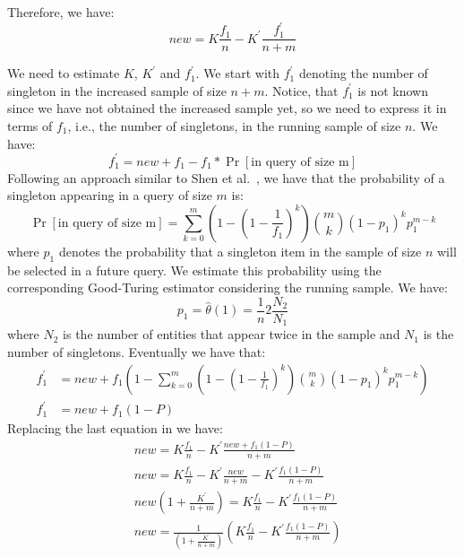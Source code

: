 \documentclass{vldb}
\begin{document}
\begin{appendix}
Therefore, we have:
\begin{equation}
\label{eq:new}
new = K\frac{f_1}{n} - K^{\prime}\frac{f^{\prime}_1}{n+m}
\end{equation}

We need to estimate $K$, $K^{\prime}$ and $f^{\prime}_1$. We start with $f^{\prime}_1$ denoting the number of singleton in the increased sample of size $n+m$. Notice, that $f^{\prime}_1$ is not known since we have not obtained the increased sample yet, so we need to express it in terms of $f_1$, i.e., the number of singletons, in the running sample of size $n$. We have:
\begin{equation}
f^{\prime}_1 = new + f_1 - f_1*\Pr[\mbox{in query of size m}]
\end{equation}
Following an approach similar to Shen et al.~\cite{shen:2003}, we have that the probability of a singleton appearing in a query of size $m$ is:
\begin{equation}
\Pr[\mbox{in query of size m}] = \sum_{k=0}^m(1-(1-\frac{1}{f_1})^k) {m \choose k}(1-p_1)^k p_1^{m-k}
\end{equation}
where $p_1$ denotes the probability that a singleton item in the sample of size $n$ will be selected in a future query. We estimate this probability using the corresponding Good-Turing estimator considering the running sample. We have:
\begin{equation}
p_1 = \hat{\theta}(1) = \frac{1}{n}2\frac{N_2}{N_1}
\end{equation} 
where $N_2$ is the number of entities that appear twice in the sample and $N_1$ is the number of singletons. 
Eventually we have that:
\begin{align}
f^{\prime}_1 &= new + f_1(1- \sum_{k=0}^m(1-(1-\frac{1}{f_1})^k) {m \choose k}(1-p_1)^k p_1^{m-k}) \nonumber \\
f^{\prime}_1 &= new + f_1(1- P)
\end{align}
Replacing the last equation in  we have:
\begin{align}
&new = K\frac{f_1}{n} - K^{\prime}\frac{new + f_1(1- P)}{n+m} \nonumber \\
&new = K\frac{f_1}{n} - K^{\prime}\frac{new}{n+m} - K^{\prime}\frac{f_1(1- P)}{n+m} \nonumber \\
&new(1 + \frac{K^{\prime}}{n+m}) = K\frac{f_1}{n} - K^{\prime}\frac{f_1(1- P)}{n+m} \nonumber \\
&new = \frac{1}{(1 + \frac{K^{\prime}}{n+m})}(K\frac{f_1}{n} - K^{\prime}\frac{f_1(1- P)}{n+m}) \nonumber
\end{align}


\end{appendix}
\end{document}
